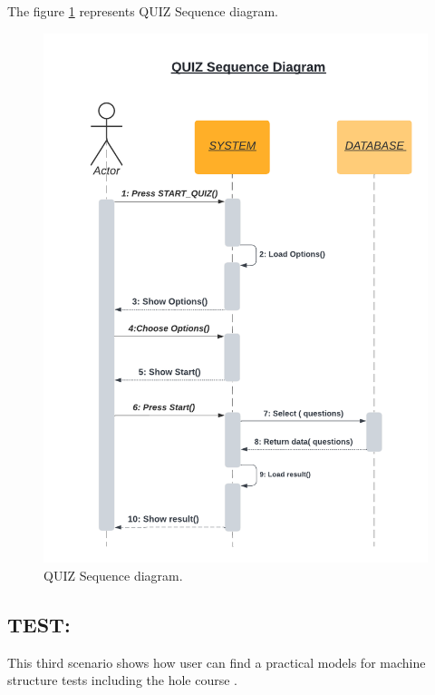 \newpage
The figure \ref{fig:QUIZ DS} represents QUIZ Sequence diagram.
\begin{figure}[ht]
	\centering
	\label{}\includegraphics[scale=0.7]{img/Quiz Sequence diagram.pdf}                
	\caption{QUIZ Sequence diagram.} 
	\label{fig:QUIZ DS}
\end{figure} 







\subsection{TEST:}
This third scenario shows how user can find a practical models for machine structure tests including the hole course .
\newpage


